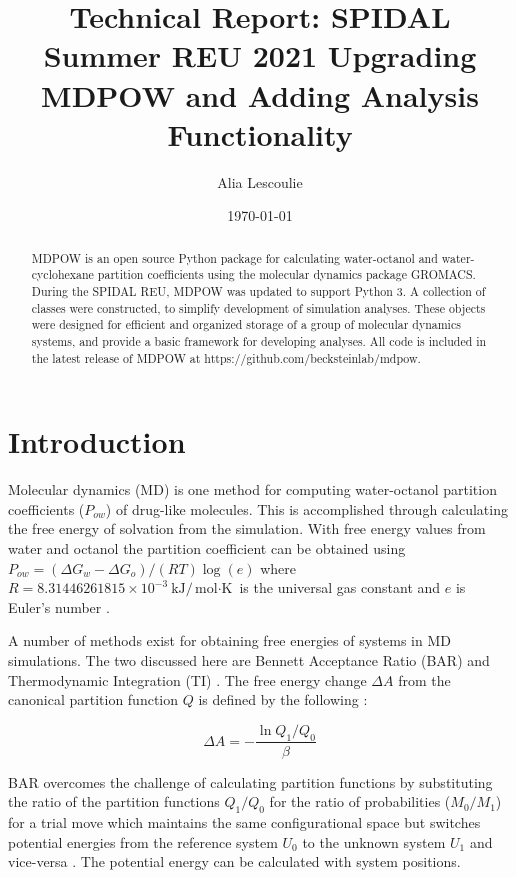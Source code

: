 \documentclass{article}[letterpaper, margins=1in, 12pt]
\title{Technical Report: SPIDAL Summer REU 2021 Upgrading MDPOW and Adding Analysis Functionality}
\date{\today}
\author{Alia Lescoulie}
\affil{Department of Chemistry and Biochemistry, College of Science and Mathematics, California Polytechnic State University, San Luis Obispo, CA, 93407}
\begin{document}
\maketitle

\begin{abstract}
MDPOW is an open source Python package for calculating water-octanol and water-cyclohexane partition coefficients using the molecular dynamics package GROMACS. During the SPIDAL REU, MDPOW was updated to support Python 3. A collection of classes were constructed, to simplify development of simulation analyses. These objects were designed for efficient and organized storage of a group of molecular dynamics systems, and provide a basic framework for developing analyses. All code is included in the latest release of MDPOW at https://github.com/becksteinlab/mdpow.
\end{abstract}

\section{Introduction}
Molecular dynamics (MD) is one method for computing water-octanol partition coefficients ($P_{ow}$) of drug-like molecules. This is accomplished through calculating the free energy of solvation from the simulation. With free energy values from water and octanol the partition coefficient can be obtained using $P_{ow} = {(\Delta G_w - \Delta G_o)}/{(RT)} \log(e)$ where $R=8.31446261815 \times 10^{-3} \: \text{{kJ}}/{ \text{mol} \cdot \text{K}}$ is the universal gas constant and $e$ is Euler's number \cite{fan_precise_2021}.

A number of methods exist for obtaining free energies of systems in MD simulations. The two discussed here are Bennett Acceptance Ratio (BAR) and Thermodynamic Integration (TI) \cite{pohorille_good_2010}. The free energy change $\Delta A$ from the canonical partition function $Q$ is defined by the following \cite{chipot_free_2007}:

\begin{equation}
\Delta A = - \frac{\ln{Q_1 / Q_0}}{\beta}
\end{equation}

BAR overcomes the challenge of calculating partition functions by substituting the ratio of the partition functions $Q_1 / Q_0$ for the ratio of probabilities ($M_0 / M_1$) for a trial move which maintains the same configurational space but switches potential energies from the reference system $U_0$ to the unknown system $U_1$ and vice-versa \cite{bennett_efficient_1976}. The potential energy can be calculated with system positions.
\end{document}
